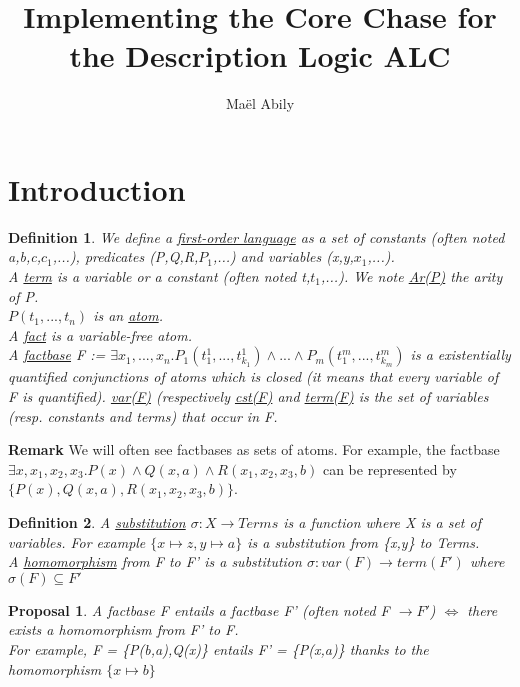 \documentclass{article}
\title{Implementing the Core Chase for the Description Logic ALC}
\author{Maël Abily}	%
\newtheorem{pro}{Proposal}
\newtheorem{defi}{Definition}
\begin{document}
\maketitle						%




\section{Introduction}

\begin{defi} We define a \underline{first-order language} as a set of constants (often noted a,b,c,$c_{1}$,...), predicates (P,Q,R,$P_{1}$,...) and variables (x,y,$x_{1}$,...). \\
A \underline{term} is a variable or a constant (often noted t,$t_{1}$,...).
We note \underline{Ar(P)} the arity of P. \\
$P(t_{1},...,t_{n})$ is an \underline{atom}. \\
A \underline{fact} is a variable-free atom. \\
A \underline{factbase} F := $\exists x_{1},...,x_{n}.P_{1}(t_{1}^{1},...,t_{k_{1}}^{1})\land ...\land P_{m}(t_{1}^{m},...,t_{k_{m}}^{m})$ is a existentially quantified conjunctions of atoms which is closed (it means that every variable of F is quantified). \underline{var(F)} (respectively \underline{cst(F)} and \underline{term(F)} is the set of variables (resp. constants and terms) that occur in F.
\end{defi}
\noindent \textbf{Remark} We will often see factbases as sets of atoms. For example, the factbase $\exists x,x_{1},x_{2},x_{3}. P(x) \land Q(x,a) \land R(x_{1},x_{2},x_{3},b)$ can be represented by \\
$\{P(x),Q(x,a),R(x_{1},x_{2},x_{3},b)\}$.

\begin{defi}
A \underline{substitution} $\sigma:X \to Terms$ is a function where X is a set of variables. For example $\{x \mapsto z, y \mapsto a \}$ is a substitution from \{x,y\} to Terms. \\
A \underline{homomorphism} from F to F' is a substitution $\sigma:var(F) \to term(F')$ where $\sigma(F) \subseteq F'$
\end{defi}
\begin{pro}
A factbase F entails a factbase F' (often noted F $\to F'$) $\Leftrightarrow$ there exists a homomorphism from F' to F. \\
For example, F = \{P(b,a),Q(x)\} entails F' = \{P(x,a)\} thanks to the homomorphism $\{x \mapsto b\}$ 
\end{pro}
\end{document}
